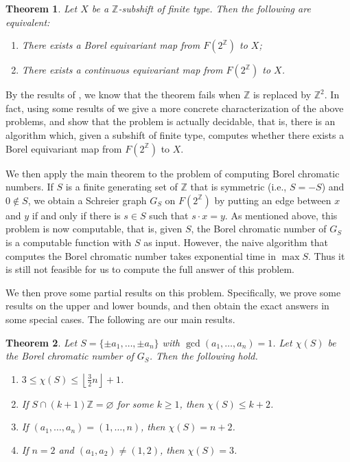 \documentclass[11pt]{amsart}
\newtheorem{theorem}{Theorem}[section]
\theoremstyle{definition}
\def\Z{\mathbb{Z}}
\def\Z{\mathbb{Z}}
\begin{document}
\begin{theorem}\label{thm:1.1} Let $X$ be a $\Z$-subshift of finite type. Then the following are equivalent:
\begin{enumerate}
\item[\rm (1)] There exists a Borel equivariant map from $F(2^\Z)$ to $X$;
\item[\rm (2)] There exists a continuous equivariant map from $F(2^\Z)$ to $X$.
\end{enumerate}
\end{theorem}

By the results of \cite{GJKS, GJKS2}, we know that the theorem fails when $\Z$ is replaced by $\Z^2$. In fact, using some results of \cite{GJKS} we give a more concrete characterization of the above problems, and show that the problem is actually decidable, that is, there is an algorithm which, given a subshift of finite type, computes whether there exists a Borel equivariant map from $F(2^\Z)$ to $X$.

We then apply the main theorem to the problem of computing Borel chromatic numbers. If $S$ is a finite generating set of $\Z$ that is symmetric (i.e., $S=-S$) and $0\not\in S$, we obtain a Schreier graph $G_S$ on $F(2^\Z)$ by putting an edge between $x$ and $y$ if and only if there is $s\in S$ such that $s\cdot x=y$. As mentioned above, this problem is now computable, that is, given $S$, the Borel chromatic number of $G_S$ is a computable function with $S$ as input. However, the naive algorithm that computes the Borel chromatic number takes exponential time in $\max S$. Thus it is still not feasible for us to compute the full answer of this problem. 

We then prove some partial results on this problem. Specifically, we prove some results on the upper and lower bounds, and then obtain the exact answers in some special cases. The following are our main results.

\begin{theorem}\label{thm:1.2} Let $S=\{\pm a_1,\dots, \pm a_n\}$ with $\gcd(a_1,\dots, a_n)=1$. Let $\chi(S)$ be the Borel chromatic number of $G_S$. Then the following hold.
\begin{enumerate}
\item[\rm (1)] $3\leq \chi(S)\leq \left\lfloor\displaystyle\frac{3}{2}n\right\rfloor +1$.
\item[\rm (2)] If $S\cap (k+1)\Z=\varnothing$ for some $k\geq 1$, then $\chi(S)\leq k+2$.
\item[\rm (3)] If $(a_1,\dots, a_n)=(1,\dots, n)$, then $\chi(S)=n+2$.
\item[\rm (4)] If $n=2$ and $(a_1, a_2)\neq (1,2)$, then $\chi(S)=3$.
\end{enumerate}
\end{theorem}
\end{document}
